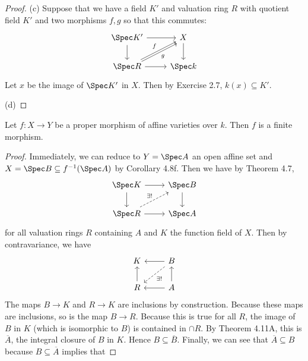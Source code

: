 \begin{proof}
	(c) Suppose that we have a field $K' $ and valuation ring $R $ with quotient field $K' $ and two morphisms $f,g $ so that this commutes:
 \[
	\begin{tikzcd}
	\Spec K' & X\\
	\Spec R & \Spec k
	\arrow[from=1-1,to=1-2]
	\arrow[from=1-1,to=2-1]
	\arrow[from=2-1,to=2-2]
	\arrow[from=1-2,to=2-2]
	\arrow["f",from=2-1,to=1-2]
	\arrow["g"',shift right,from=2-1,to=1-2]
	\end{tikzcd}
	\]
	Let $x $ be the image of $\Spec K' $ in $X $.
	Then by Exercise 2.7, $k(x) \subseteq K' $.

	(d)
\end{proof}

\begin{exercise}
	Let $f: X\to Y $ be a proper morphism of affine varieties over $k $. Then $f $ is a finite morphism.
	\fi
\end{exercise}
\begin{proof}
	Immediately, we can reduce to $Y = \Spec A $ an open affine set and $X = \Spec B \subseteq f^{-1}(\Spec A) $ by Corollary 4.8f.
	Then we have by Theorem 4.7,
	\[
	\begin{tikzcd}
	\Spec K & \Spec B\\
	\Spec R & \Spec A
	\arrow[from=1-1,to=1-2]
	\arrow[from=1-1,to=2-1]
	\arrow[from=2-1,to=2-2]
	\arrow[from=1-2,to=2-2]
	\arrow["\exists !",dashed,from=2-1,to=1-2]
	\end{tikzcd}
	\]
	for all valuation rings $R $ containing $A $ and $K $ the function field of $X $.
	Then by contravariance, we have
	\[
	\begin{tikzcd}
	K & B\\
	R & A
	\arrow[from=1-2,to=1-1]
	\arrow[from=2-1,to=1-1]
	\arrow[from=2-2,to=2-1]
	\arrow[from=2-2,to=1-2]
	\arrow["\exists !",dashed,from=1-2,to=2-1]
	\end{tikzcd}
	\]
	The maps $B\to K $ and $R\to K $ are inclusions by construction.
	Because these maps are inclusions, so is the map $B\to R $.
	Because this is true for all $R $, the image of $B $ in $K $ (which is isomorphic to $B $) is contained in $\cap R $.
	By Theorem 4.11A, this is $\overline{A}  $, the integral closure of $B $ in $K $.
	Hence $B \subseteq \overline{B}  $.
	Finally, we can see that $\overline{A} \subseteq B  $	 because $B \subseteq \overline{A}  $ implies that
\end{proof}


